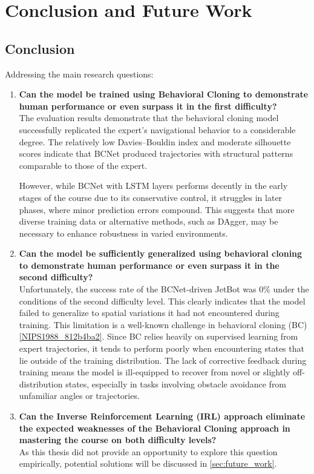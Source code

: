 \chapter{Conclusion and Future Work}
\label{cha:Conclusion}

\section{Conclusion}

Addressing the main research questions:

\begin{enumerate}
  \item \textbf{Can the model be trained using Behavioral Cloning to demonstrate human performance or even surpass it in the first difficulty?} \\
    The evaluation results demonstrate that the behavioral cloning model successfully replicated the expert’s navigational behavior to a considerable degree. The relatively low Davies–Bouldin index and moderate silhouette scores indicate that BCNet produced trajectories with structural patterns comparable to those of the expert.

    However, while BCNet with LSTM layers performs decently in the early stages of the course due to its conservative control, it struggles in later phases, where minor prediction errors compound. This suggests that more diverse training data or alternative methods, such as DAgger, may be necessary to enhance robustness in varied environments.

  \item \textbf{Can the model be sufficiently generalized using behavioral cloning to demonstrate human performance or even surpass it in the second difficulty?} \\
    Unfortunately, the success rate of the BCNet-driven JetBot was 0\% under the conditions of the second difficulty level. This clearly indicates that the model failed to generalize to spatial variations it had not encountered during training. This limitation is a well-known challenge in behavioral cloning (BC) \autoref{NIPS1988_812b4ba2}. Since BC relies heavily on supervised learning from expert trajectories, it tends to perform poorly when encountering states that lie outside of the training distribution. The lack of corrective feedback during training means the model is ill-equipped to recover from novel or slightly off-distribution states, especially in tasks involving obstacle avoidance from unfamiliar angles or trajectories.

  \item \textbf{Can the Inverse Reinforcement Learning (IRL) approach eliminate the expected weaknesses of the Behavioral Cloning approach in mastering the course on both difficulty levels?} \\
    As this thesis did not provide an opportunity to explore this question empirically, potential solutions will be discussed in \autoref{sec:future_work}.
\end{enumerate}

